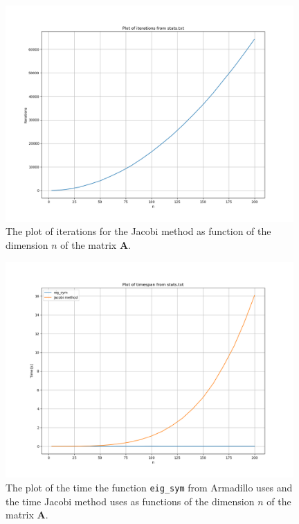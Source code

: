 \documentclass{article}
\begin{document}

  \begin{figure}[ht]
  	\centering
    \includegraphics[width = 11cm]{iterations-stats.png}
  	\caption{The plot of iterations for the Jacobi method as function of the dimension $n$ of the matrix \textbf{A}. }
    \label{fig:iterationspng}
  \end{figure}

  \begin{figure}[ht]
    \centering
    \includegraphics[width = 11cm]{timespan-stats.png}
    \caption{The plot of the time the function \texttt{eig\_sym} from Armadillo uses and the time Jacobi method uses as functions of the dimension $n$ of the matrix \textbf{A}. }
    \label{fig:timespanpng}
  \end{figure}
\end{document}
